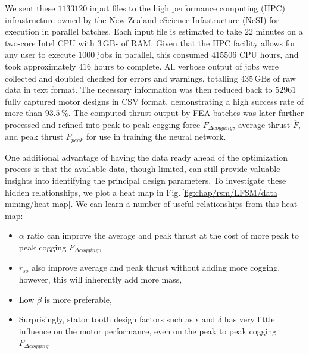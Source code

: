             
            We sent these $1133120$ input files to the high performance computing (HPC) infrastructure owned by the New Zealand eScience Infastructure (NeSI) for execution in parallel batches. Each input file is estimated to take $22$ minutes on a two-core Intel CPU with $3\,\mathrm{GBs}$ of RAM. Given that the HPC facility allows for any user to execute $1000$ jobs in parallel, this consumed $415506$ CPU hours, and took approximately $416$ hours to complete. All verbose output of jobs were collected and doubled checked for errors and warnings, totalling $435\,\mathrm{GBs}$ of raw data in text format. The necessary information was then reduced back to $52961$ fully captured motor designs in CSV format, demonstrating a high success rate of more than $93.5\,\%$. The computed thrust output by FEA batches was later further processed and refined into peak to peak cogging force $F_{\Delta cogging}$, average thrust $\overline{F}$, and peak thrust $F_{peak}$ for use in training the neural network.
            
            
            One additional advantage of having the data ready ahead of the optimization process is that the available data, though limited, can still provide valuable insights into identifying the principal design parameters. To investigate these hidden relationships, we plot a heat map in Fig.\,\ref{fig:chap/rsm/LFSM/data mining/heat map}. We can learn a number of useful relationships from this heat map:
            
            
            \begin{itemize}
                \item $\alpha$ ratio can improve the average and peak thrust at the cost of more peak to peak cogging $F_{\Delta cogging}$,
                \item $r_{so}$ also improve average and peak thrust without adding more cogging, however, this will inherently add more mass,
                \item Low $\beta$ is more preferable,
                \item Surprisingly, stator tooth design factors such as $\epsilon$ and $\delta$ has very little influence on the motor performance, even on the peak to peak cogging $F_{\Delta cogging}$
            \end{itemize}
            
